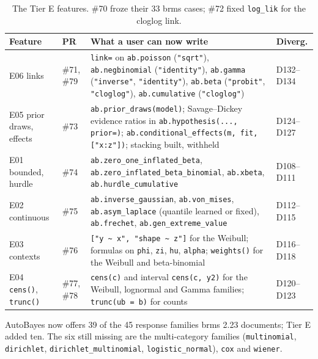 \documentclass[11pt]{article}
\newcommand{\code}[1]{\texttt{#1}}
\begin{document}
\begin{table}[tbp]
\small
\begin{center}\begin{tabular}{@{}>{\raggedright\arraybackslash}p{}>{\raggedright\arraybackslash}p{}>{\raggedright\arraybackslash}p{}>{\raggedright\arraybackslash}p{}@{}}
\toprule
Feature & PR & What a user can now write & Diverg. \\
\midrule
E06 links & \#71, \#79 & \code{link=} on \code{ab.poisson} (\code{"sqrt"}), \code{ab.negbinomial} (\code{"identity"}), \code{ab.gamma} (\code{"inverse"}, \code{"identity"}), \code{ab.beta} (\code{"probit"}, \code{"cloglog"}), \code{ab.cumulative} (\code{"cloglog"}) & D132--D134 \\
E05 prior draws, effects & \#73 & \code{ab.prior\_draws(model)}; Savage--Dickey evidence ratios in \code{ab.hypothesis(..., prior=)}; \code{ab.conditional\_effects(m, fit, ["x:z"])}; stacking built, withheld & D124--D127 \\
E01 bounded, hurdle & \#74 & \code{ab.zero\_one\_inflated\_beta}, \code{ab.zero\_inflated\_beta\_binomial}, \code{ab.xbeta}, \code{ab.hurdle\_cumulative} & D108--D111 \\
E02 continuous & \#75 & \code{ab.inverse\_gaussian}, \code{ab.von\_mises}, \code{ab.asym\_laplace} (quantile learned or fixed), \code{ab.frechet}, \code{ab.gen\_extreme\_value} & D112--D115 \\
E03 contexts & \#76 & \code{["y \textasciitilde{} x", "shape \textasciitilde{} z"]} for the Weibull; formulas on \code{phi}, \code{zi}, \code{hu}, \code{alpha}; \code{weights()} for the Weibull and beta-binomial & D116--D118 \\
E04 \code{cens()}, \code{trunc()} & \#77, \#78 & \code{cens(c)} and interval \code{cens(c, y2)} for the Weibull, lognormal and Gamma families; \code{trunc(ub = b)} for counts & D120--D123 \\
\bottomrule
\end{tabular}\end{center}
\caption{\small The Tier E features. \#70 froze their 33 brms cases; \#72 fixed \code{log\_lik} for the cloglog link.}\label{tab:built}
\end{table}

\noindent AutoBayes now offers 39 of the 45 response families brms 2.23 documents; Tier E added ten. The six still missing
are the multi-category families (\code{multinomial}, \code{dirichlet}, \code{dirichlet\_multinomial},
\code{logistic\_normal}), \code{cox} and \code{wiener}.
\end{document}
